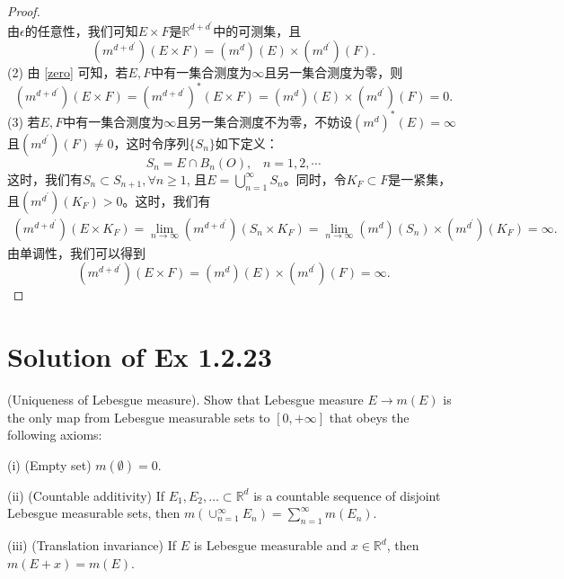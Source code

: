 \documentclass[reqno,a4paper,14pt]{amsart}
\begin{document}
\begin{proof}
\begin{equation*}
    \end{equation*}
    由$\epsilon$的任意性，我们可知$E\times F$是$\mathbb{R}^{d+d^\prime}$中的可测集，且
    \begin{equation*}
        (m^{d+d^\prime})(E\times F)=(m^d)(E)\times (m^{d^\prime})(F).
    \end{equation*}
    (2) 由 \eqref{zero} 可知，若$E,F$中有一集合测度为$\infty$且另一集合测度为零，则
    \begin{equation*}
        (m^{d+d^\prime})(E\times F)=(m^{d+d^\prime})^*(E\times F)=(m^d)(E)\times (m^{d^\prime})(F)=0.
    \end{equation*}
    (3) 若$E,F$中有一集合测度为$\infty$且另一集合测度不为零，不妨设$(m^d)^*(E)=\infty$且$(m^{d^\prime})(F)\neq 0$，这时令序列$\{S_n\}$如下定义：
    \begin{equation*}
        S_n=E\cap B_n(O),\;\;\; n=1,2,\cdots
    \end{equation*}
    这时，我们有$S_n\subset S_{n+1},\forall n\geq 1$, 且$E=\bigcup_{n=1}^\infty S_n$。同时，令$K_F\subset F$是一紧集，且$(m^{d^\prime})(K_F)>0$。这时，我们有
    \begin{equation*}
        \begin{split}
            (m^{d+d^\prime})(E\times K_F)=\lim_{n\to\infty}(m^{d+d^\prime})(S_n\times K_F)=\lim_{n\to\infty}(m^d)(S_n)\times (m^{d^\prime})(K_F)=\infty.
        \end{split}
    \end{equation*}
    由单调性，我们可以得到
    \begin{equation*}
        (m^{d+d^\prime})(E\times F)=(m^d)(E)\times (m^{d^\prime})(F)=\infty.
    \end{equation*}
\end{proof}


\section{Solution of Ex 1.2.23}
(Uniqueness of Lebesgue measure). Show that Lebesgue measure $E\to m(E)$ is the only map from Lebesgue measurable sets to $[0,+\infty]$ that obeys the following axioms:

(i) (Empty set) $m(\emptyset) =0$.

(ii) (Countable additivity) If $E_1,E_2,\dots \subset \mathbb{R}^d$ is a countable sequence of disjoint Lebesgue measurable sets, then $m(\cup_{n=1}^\infty E_n)=\sum_{n=1}^\infty m(E_n)$.

(iii) (Translation invariance) If $E$ is Lebesgue measurable and $x\in \mathbb{R}^d$, then $m(E+x)=m(E)$.
\end{document}
